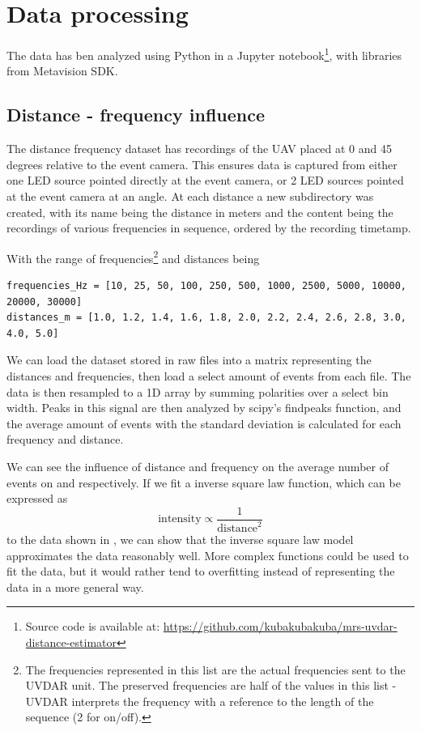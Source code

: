 
\chapter{Data processing\label{chap:data_processing}}

The data has ben analyzed using Python in a Jupyter notebook\footnote{Source code is available at: \url{https://github.com/kubakubakuba/mrs-uvdar-distance-estimator}}, with libraries from Metavision SDK.

\section{Distance - frequency influence}

The distance frequency dataset has recordings of the UAV placed at 0 and 45 degrees relative to the event camera. This ensures data is captured from either
one LED source pointed directly at the event camera, or 2 LED sources pointed at the event camera at an angle. At each distance a new subdirectory was
created, with its name being the distance in meters and the content being the recordings of various frequencies in sequence, ordered by the recording timetamp.

With the range of frequencies\footnote{The frequencies represented in this list are the actual frequencies sent to the UVDAR unit. The preserved frequencies
are half of the values in this list - UVDAR interprets the frequency with a reference to the length of the sequence (2 for on/off).} and distances being

\begin{lstlisting}
frequencies_Hz = [10, 25, 50, 100, 250, 500, 1000, 2500, 5000, 10000, 20000, 30000]
distances_m = [1.0, 1.2, 1.4, 1.6, 1.8, 2.0, 2.2, 2.4, 2.6, 2.8, 3.0, 4.0, 5.0]
\end{lstlisting}

We can load the dataset stored in raw files into a matrix representing the distances and frequencies, then load a select amount of events from each file.
The data is then resampled to a 1D array by summing polarities over a select bin width. Peaks in this signal are then analyzed by scipy's findpeaks function,
and the average amount of events with the standard deviation is calculated for each frequency and distance.

We can see the influence of distance and frequency on the average number of events on
 and  respectively. If we fit a inverse square law function,
which can be expressed as
\begin{equation}
	\text{intensity} \propto \frac{1}{\text{distance}^2}
\end{equation}
to the data shown in , we can show that the inverse square law model
approximates the data reasonably well.
More complex functions could be used to fit the data, but it would rather tend to overfitting instead
of representing the data in a more general way.

